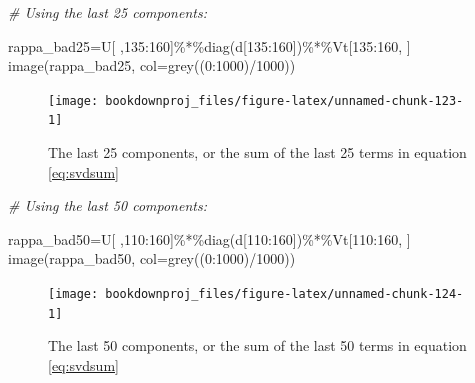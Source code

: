 \documentclass[
]{article}
\newenvironment{Shaded}{\begin{snugshade}}{\end{snugshade}}
\newcommand{\AttributeTok}[1]{\textcolor[rgb]{0.77,0.63,0.00}{#1}}
\newcommand{\CommentTok}[1]{\textcolor[rgb]{0.56,0.35,0.01}{\textit{#1}}}
\newcommand{\DecValTok}[1]{\textcolor[rgb]{0.00,0.00,0.81}{#1}}
\newcommand{\FunctionTok}[1]{\textcolor[rgb]{0.00,0.00,0.00}{#1}}
\newcommand{\NormalTok}[1]{#1}
\newcommand{\OtherTok}[1]{\textcolor[rgb]{0.56,0.35,0.01}{#1}}
\newcommand{\SpecialCharTok}[1]{\textcolor[rgb]{0.00,0.00,0.00}{#1}}
\theoremstyle{definition}
\theoremstyle{definition}
\theoremstyle{definition}
\theoremstyle{definition}
\theoremstyle{remark}
\begin{document}
\begin{Shaded}
\begin{Highlighting}[]
\CommentTok{\# Using the last 25 components:}

\NormalTok{rappa\_bad25}\OtherTok{=}\NormalTok{U[ ,}\DecValTok{135}\SpecialCharTok{:}\DecValTok{160}\NormalTok{]}\SpecialCharTok{\%*\%}\FunctionTok{diag}\NormalTok{(d[}\DecValTok{135}\SpecialCharTok{:}\DecValTok{160}\NormalTok{])}\SpecialCharTok{\%*\%}\NormalTok{Vt[}\DecValTok{135}\SpecialCharTok{:}\DecValTok{160}\NormalTok{, ]}
\FunctionTok{image}\NormalTok{(rappa\_bad25, }\AttributeTok{col=}\FunctionTok{grey}\NormalTok{((}\DecValTok{0}\SpecialCharTok{:}\DecValTok{1000}\NormalTok{)}\SpecialCharTok{/}\DecValTok{1000}\NormalTok{))}
\end{Highlighting}
\end{Shaded}

\begin{figure}

{\centering \texttt{[image: bookdownproj\_files/figure-latex/unnamed-chunk-123-1]} 

}

\caption{The last 25 components, or the sum of the last 25 terms in equation \eqref{eq:svdsum}}\label{fig:unnamed-chunk-123}
\end{figure}



\begin{Shaded}
\begin{Highlighting}[]
\CommentTok{\# Using the last 50 components:}

\NormalTok{rappa\_bad50}\OtherTok{=}\NormalTok{U[ ,}\DecValTok{110}\SpecialCharTok{:}\DecValTok{160}\NormalTok{]}\SpecialCharTok{\%*\%}\FunctionTok{diag}\NormalTok{(d[}\DecValTok{110}\SpecialCharTok{:}\DecValTok{160}\NormalTok{])}\SpecialCharTok{\%*\%}\NormalTok{Vt[}\DecValTok{110}\SpecialCharTok{:}\DecValTok{160}\NormalTok{, ]}
\FunctionTok{image}\NormalTok{(rappa\_bad50, }\AttributeTok{col=}\FunctionTok{grey}\NormalTok{((}\DecValTok{0}\SpecialCharTok{:}\DecValTok{1000}\NormalTok{)}\SpecialCharTok{/}\DecValTok{1000}\NormalTok{))}
\end{Highlighting}
\end{Shaded}

\begin{figure}

{\centering \texttt{[image: bookdownproj\_files/figure-latex/unnamed-chunk-124-1]} 

}

\caption{The last 50 components, or the sum of the last 50 terms in equation \eqref{eq:svdsum}}\label{fig:unnamed-chunk-124}
\end{figure}
\end{document}
